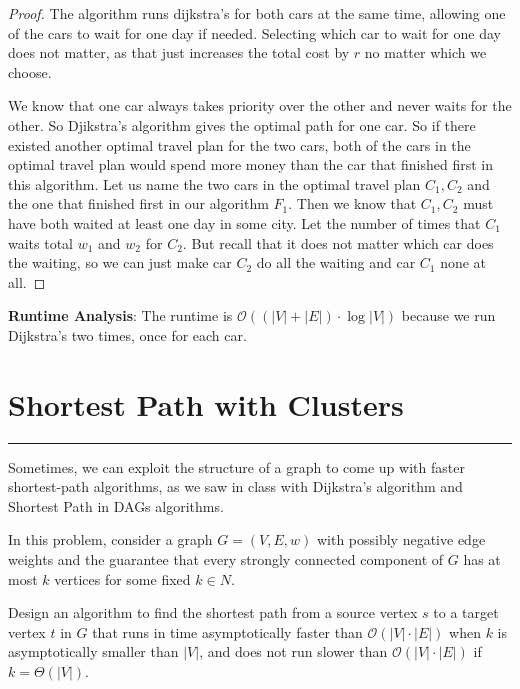 \documentclass{article}
\begin{document}
\begin{answer}
        \begin{proof}
            The algorithm runs dijkstra's for both cars at the same time, allowing one of the cars to wait for one day if needed. Selecting which car to wait for one day does not matter, as that just increases the total cost by $r$ no matter which we choose. 

            We know that one car always takes priority over the other and never waits for the other. So Djikstra's algorithm gives the optimal path for one car. So if there existed another optimal travel plan for the two cars, both of the cars in the optimal travel plan would spend more money than the car that finished first in this algorithm. Let us name the two cars in the optimal travel plan $C_{1}, C_{2}$ and the one that finished first in our algorithm $F_{1}$. Then we know that $C_{1}, C_{2}$ must have both waited at least one day in some city. Let the number of times that $C_{1}$ waits total $w_{1}$ and $w_{2}$ for $C_{2}$. But recall that it does not matter which car does the waiting, so we can just make car $C_{2}$ do all the waiting and car $C_{1}$ none at all. 
        \end{proof}

        \textbf{Runtime Analysis}: The runtime is $\mathcal{O}((\lvert V \rvert + \lvert E \rvert) \cdot \log{\lvert V \rvert})$ because we run Dijkstra's two times, once for each car.
    \end{answer}

\newpage
\section*{Shortest Path with Clusters}
\hrule

Sometimes, we can exploit the structure of a graph to come up with faster shortest-path algorithms, as we saw in class with Dijkstra's algorithm and Shortest Path in DAGs algorithms.

In this problem, consider a graph $G = (V, E, w)$ with possibly negative edge weights and the guarantee that every strongly connected component of $G$ has at most $k$ vertices for some fixed $k \in N$.

Design an algorithm to find the shortest path from a source vertex $s$ to a target vertex $t$ in $G$ that runs in time asymptotically faster than $\mathcal{O}(\lvert V \rvert \cdot \lvert E \rvert)$ when $k$ is asymptotically smaller than $\lvert V \rvert$, and does not run slower than $\mathcal{O}(\lvert V \rvert \cdot \lvert E \rvert)$ if $k = \Theta(\lvert V \rvert)$.
\end{document}
